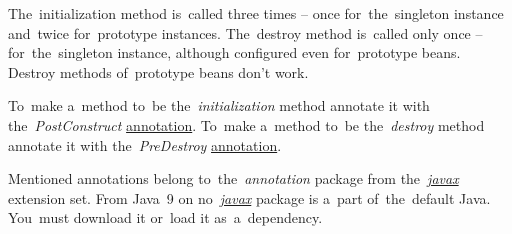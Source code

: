 \noindent The~initialization method is~called three times -- once for~the~singleton instance and~twice for~prototype instances.
The~destroy method is~called only once -- for~the~singleton instance, although configured even for~prototype beans.
Destroy methods of~prototype beans don't work.

\label{beanlifecycleannotations}
To~make a~method to~be the~\textit{initialization} method annotate it with the~\textit{PostConstruct} \hyperref[javaannotation]{annotation}.
To~make a~method to~be the~\textit{destroy} method annotate it with the~\textit{PreDestroy} \hyperref[javaannotation]{annotation}.

\warning Mentioned annotations belong to~the~\textit{annotation} package from the~\hyperref[javax]{\textit{javax}} extension set.
From Java~9 on no~\hyperref[javax]{\textit{javax}} package is a~part of~the~default Java.
You~must download it or~load it as~a~dependency.


